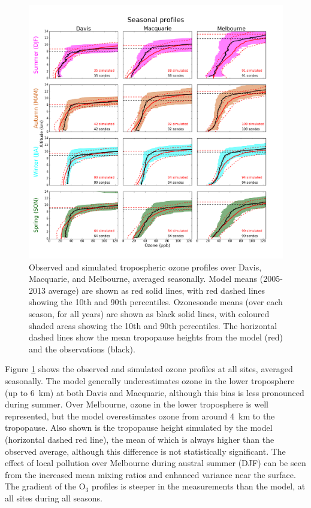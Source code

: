   \begin{figure}[t]
    \includegraphics[width=14.0cm]{figures/seasonalprofiles00.png}
    \caption{%
      Observed and simulated tropospheric ozone profiles over Davis, Macquarie, and Melbourne, averaged seasonally.
      Model means (2005-2013 average) are shown as red solid lines, with red dashed lines showing the 10th and 90th percentiles.
      Ozonesonde means (over each season, for all years) are shown as black solid lines, with coloured shaded areas showing the 10th and 90th percentiles.
      The horizontal dashed lines show the mean tropopause heights from the model (red) and the observations (black).}
    \label{fig:GEOSChemSeasonalProfiles}
  \end{figure}
  
  Figure \ref{fig:GEOSChemSeasonalProfiles} shows the observed and simulated ozone profiles at all sites, averaged seasonally.
  The model generally underestimates ozone in the lower troposphere (up to 6~km) at both Davis and Macquarie, although this bias is less pronounced during summer.
  Over Melbourne, ozone in the lower troposphere is well represented, but the model overestimates ozone from around 4~km to the tropopause.
  Also shown is the tropopause height simulated by the model (horizontal dashed red line), the mean of which is always higher than the observed average, although this difference is not statistically significant.
  The effect of local pollution over Melbourne during austral summer (DJF) can be seen from the increased mean mixing ratios and enhanced variance near the surface.
  The gradient of the O$_3$ profiles is steeper in the measurements than the model, at all sites during all seasons.
  
